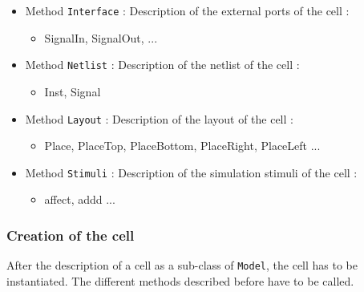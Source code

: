 \begin{itemize}
\item Method \verb-Interface- : Description of the external ports of the cell :
    \begin{itemize}
        \item SignalIn, SignalOut, ...
    \end{itemize}
\item Method \verb-Netlist- : Description of the netlist of the cell :
    \begin{itemize}
        \item Inst, Signal
    \end{itemize}
\item Method \verb-Layout- : Description of the layout of the cell :
    \begin{itemize}
        \item Place, PlaceTop, PlaceBottom, PlaceRight, PlaceLeft ...
    \end{itemize}
\item Method \verb-Stimuli- : Description of the simulation stimuli of the cell :
    \begin{itemize}
        \item affect, addd ...
    \end{itemize}
\end{itemize}

\subsubsection{Creation of the cell}

After the description of a cell as a sub-class of \verb-Model-, the cell has to be instantiated. The different methods described before have to be called.
 
